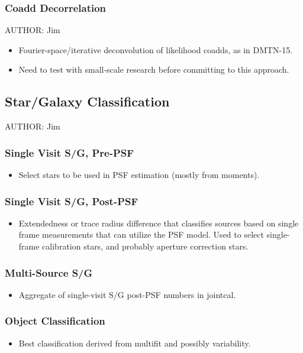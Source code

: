 \subsubsection{Coadd Decorrelation}
AUTHOR: Jim
\begin{itemize}
\item Fourier-space/iterative deconvolution of likelihood coadds, as in DMTN-15.
\item Need to test with small-scale research before committing to this approach.
\end{itemize}

\subsection{Star/Galaxy Classification}
AUTHOR: Jim
\subsubsection{Single Visit S/G, Pre-PSF}
\begin{itemize}
\item Select stars to be used in PSF estimation (mostly from moments).
\end{itemize}
\subsubsection{Single Visit S/G, Post-PSF}
\begin{itemize}
\item Extendedness or trace radius difference that classifies sources based on single frame measurements that can utilize the PSF model.  Used to select single-frame calibration stars, and probably aperture correction stars.
\end{itemize}
\subsubsection{Multi-Source S/G}
\begin{itemize}
\item Aggregate of single-visit S/G post-PSF numbers in jointcal.
\end{itemize}
\subsubsection{Object Classification}
\begin{itemize}
\item Best classification derived from multifit and possibly variability.
\end{itemize}

